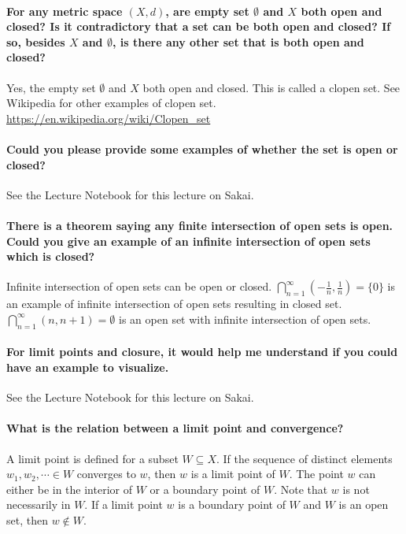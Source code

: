 \documentclass[10pt,english]{article}
\begin{document}
\paragraph{For any metric space $(X, d)$, are empty set $\emptyset$ and $X$ both open and closed? Is it contradictory that a set can be both open and closed? If so, besides $X$ and $\emptyset$, is there any other set that is both open and closed?}

Yes, the empty set $\emptyset$ and $X$ both open and closed. This is called a clopen set. See Wikipedia for other examples of clopen set. \url{https://en.wikipedia.org/wiki/Clopen_set}


\paragraph{Could you please provide some examples of whether the set is open or closed?}

See the Lecture Notebook for this lecture on Sakai.

\paragraph{There is a theorem saying any finite intersection of open sets is open. Could you give an example of an infinite intersection of open sets which is closed?}

Infinite intersection of open sets can be open or closed. $\bigcap_{n=1}^{\infty}\left(-\frac{1}{n}, \frac{1}{n}\right) = \{0\}$ is an example of infinite intersection of open sets resulting in closed set. $\bigcap_{n=1}^{\infty}(n, n+1) = \emptyset$ is an open set with infinite intersection of open sets.


\paragraph{For limit points and closure, it would help me understand if you could have an example to visualize.}

See the Lecture Notebook for this lecture on Sakai.

\paragraph{What is the relation between a limit point and convergence?}

A limit point is defined for a subset $W \subseteq X$. If the sequence of distinct elements $w_1, w_2, \cdots \in W$ converges to $w$, then $w$ is a limit point of $W$. The point $w$ can either be in the interior of $W$ or a boundary point of $W$. Note that $w$ is not necessarily in $W$. If a limit point $w$ is a boundary point of $W$ and $W$ is an open set, then $w \notin W$.
\end{document}
